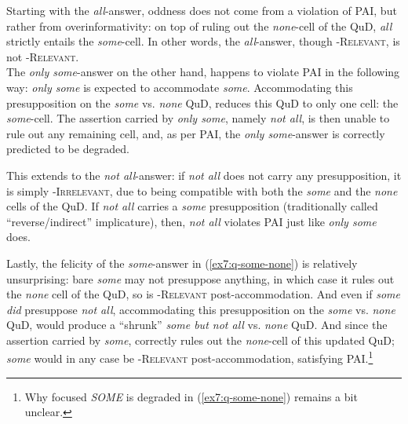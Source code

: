 \begin{exe}
	\label{ex7:q-some-none}
	\begin{xlist}
	\end{xlist}
\end{exe}

Starting with the \textit{all}-answer, oddness does not come from a violation of PAI, but rather from overinformativity: on top of ruling out the \textit{none}-cell of the QuD, \textit{all} strictly entails the \textit{some}-cell. In other words, the \textit{all}-answer, though \textsc{\citeauthor{Roberts2012}-Relevant}, is not \textsc{\citeauthor{Lewis1988}-Relevant}.\\

The \textit{only some}-answer on the other hand, happens to violate PAI in the following way: \textit{only some} is expected to accommodate \textit{some}. Accommodating this presupposition on the \textit{some} vs. \textit{none} QuD, reduces this QuD to only one cell: the \textit{some}-cell. The assertion carried by \textit{only some}, namely \textit{not all}, is then unable to rule out any remaining cell, and, as per PAI, the \textit{only some}-answer is correctly predicted to be degraded.

This extends to the \textit{not all}-answer: if \textit{not all} does not carry any presupposition, it is simply \textsc{\citeauthor{Roberts2012}-Irrelevant}, due to being compatible with both the \textit{some} and the \textit{none} cells of the QuD. If \textit{not all} carries a \textit{some} presupposition (traditionally called ``reverse/indirect'' implicature), then, \textit{not all} violates PAI just like \textit{only some} does.

Lastly, the felicity of the \textit{some}-answer in (\ref{ex7:q-some-none}) is relatively unsurprising: bare \textit{some} may not presuppose anything, in which case it rules out the \textit{none} cell of the QuD, so is \textsc{\citeauthor{Roberts2012}-Relevant} post-accommodation. And even if \textit{some} \textit{did} presuppose \textit{not all}, accommodating this presupposition on the \textit{some} vs. \textit{none} QuD, would produce a ``shrunk'' \textit{some but not all} vs. \textit{none} QuD. And since the assertion carried by \textit{some}, correctly rules out the \textit{none}-cell of this updated QuD; \textit{some} would in any case be \textsc{\citeauthor{Roberts2012}-Relevant} post-accommodation, satisfying PAI.\footnote{Why focused \textit{SOME} is degraded in (\ref{ex7:q-some-none}) remains a bit unclear.}\\

